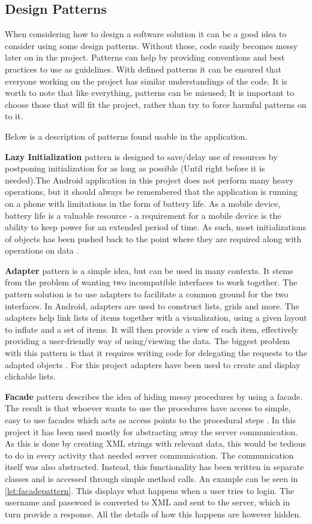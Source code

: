 \subsection{Design Patterns}\label{subsec:patterns}
When considering how to design a software solution it can be a good idea to consider using some design patterns. Without those, code easily becomes messy later on in the project. Patterns can help by providing conventions and best practices to use as guidelines. With defined patterns it can be ensured that everyone working on the project has similar understandings of the code. It is worth to note that like everything, patterns can be misused; It is important to choose those that will fit the project, rather than try to force harmful patterns on to it. 

Below is a description of patterns found usable in the application.

\textbf{Lazy Initialization} pattern is designed to save/delay use of resources by postponing initialization for as long as possible (Until right before it is needed).The Android application in this project does not perform many heavy operations, but it should always be remembered that the application is running on a phone with limitations in the form of battery life. As a mobile device, battery life is a valuable resource - a requirement for a mobile device is the ability to keep power for an extended period of time. As such, most initializations of objects has been pushed back to the point where they are required along with operations on data \cite{lazyInit}.

\textbf{Adapter} pattern is a simple idea, but can be used in many contexts. It stems from the problem of wanting two incompatible interfaces to work together. The pattern solution is to use adapters to facilitate a common ground for the two interfaces. In Android, adapters are used to construct lists, grids and more. The adapters help link lists of items together with a visualization, using a given layout to inflate and a set of items. It will then provide a view of each item, effectively providing a user-friendly way of using/viewing the data. The biggest problem with this pattern is that it requires writing code for delegating the requests to the adapted objects \cite{adappat}. For this project adapters have been used to create and display clickable lists.

\textbf{Facade} pattern describes the idea of hiding messy procedures by using a facade. The result is that whoever wants to use the procedures have access to simple, easy to use facades which acts as access points to the procedural steps \cite{facpat}. In this project it has been used mostly for abstracting away the server communication. As this is done by creating XML strings with relevant data, this would be tedious to do in every activity that needed server communication. The communication itself was also abstracted. Instead, this functionality has been written in separate classes and is accessed through simple method calls. An example can be seen in \ref{lst:facadepattern}. This displays what happens when a user tries to login. The username and password is converted to XML and sent to the server, which in turn provide a response. All the details of how this happens are however hidden.

